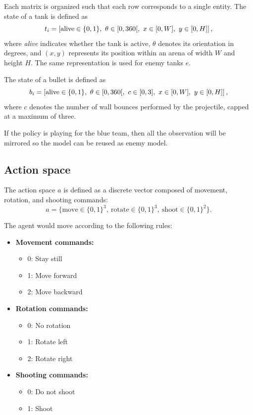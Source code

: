 \documentclass[conf]{new-aiaa}
\begin{document}
Each matrix is organized such that each row corresponds to a single entity. The state of a tank is defined as
\[
t_i = \left[\text{alive} \in \{0,1\},\ \theta \in \interval[open right]{0}{360},\ x \in \interval{0}{W},\ y \in \interval{0}{H}\right],
\]
where \textit{alive} indicates whether the tank is active, $\theta$ denotes its orientation in degrees, and $(x,y)$ represents its position within an arena of width $W$ and height $H$. The same representation is used for enemy tanks $e$.

The state of a bullet is defined as
\[
b_i = \left[\text{alive} \in \{0,1\},\ \theta \in \interval[open right]{0}{360},\ c \in \interval{0}{3},\ x \in \interval{0}{W},\ y \in \interval{0}{H}\right],
\]
where $c$ denotes the number of wall bounces performed by the projectile, capped at a maximum of three.

If the policy is playing for the blue team, then all the observation will be mirrored so the model can be reused as enemy model.

\subsection{Action space}

The action space $a$ is defined as a discrete vector composed of movement, rotation, and shooting commands:
\[
a = \{\text{move} \in \{0,1\}^3,\ \text{rotate} \in \{0,1\}^3,\ \text{shoot} \in \{0,1\}^2\}.
\]

The agent would move according to the following rules:

\begin{itemize}
    \item \textbf{Movement commands:}
    \begin{itemize}
        \item 0: Stay still
        \item 1: Move forward
        \item 2: Move backward
    \end{itemize}

    \item \textbf{Rotation commands:}
    \begin{itemize}
        \item 0: No rotation
        \item 1: Rotate left
        \item 2: Rotate right
    \end{itemize}

    \item \textbf{Shooting commands:}
    \begin{itemize}
        \item 0: Do not shoot
        \item 1: Shoot
    \end{itemize}
\end{itemize}
\end{document}
